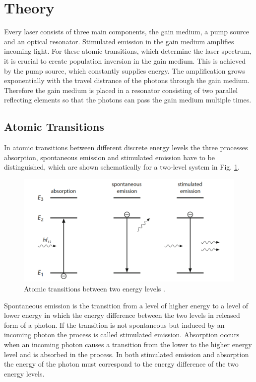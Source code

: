 \section{Theory}
Every laser consists of three main components, the gain medium, a pump source
and an optical resonator. 
Stimulated emission in the gain medium amplifies incoming light. For these atomic transitions,
which determine the laser spectrum, it is crucial to create population inversion in the 
gain medium. This is achieved by the pump source, which constantly supplies energy.
The amplification grows exponentially with the travel distrance of the photons through 
the gain medium. Therefore the gain medium is placed in a resonator consisting of two 
parallel reflecting elements so that the photons can pass the gain medium multiple times.

\subsection*{Atomic Transitions}
In atomic transitions between different discrete energy levels the three processes 
absorption, spontaneous emission and stimulated emission have to be distinguished, which are
shown schematically for a two-level system in Fig. \ref{fig:transitions}.
\begin{figure}
    \centering
    \includegraphics[width = 0.8\linewidth]{Bilder/transitions.png}
    \caption{Atomic transitions between two energy levels \cite{eichler}.}
    \label{fig:transitions}
\end{figure}
Spontaneous emission is the transition from a level of higher energy to a level of lower 
energy in which the energy difference between the two levels in released form of a photon.
If the transition is not spontaneous but induced by an incoming photon the process is 
called stimulated emission. 
Absorption occurs when an incoming photon causes a transition 
from the lower to the higher energy level and is absorbed in the process. 
In both stimulated emission and absorption the energy of the photon must correspond to the energy 
difference of the two energy levels.

